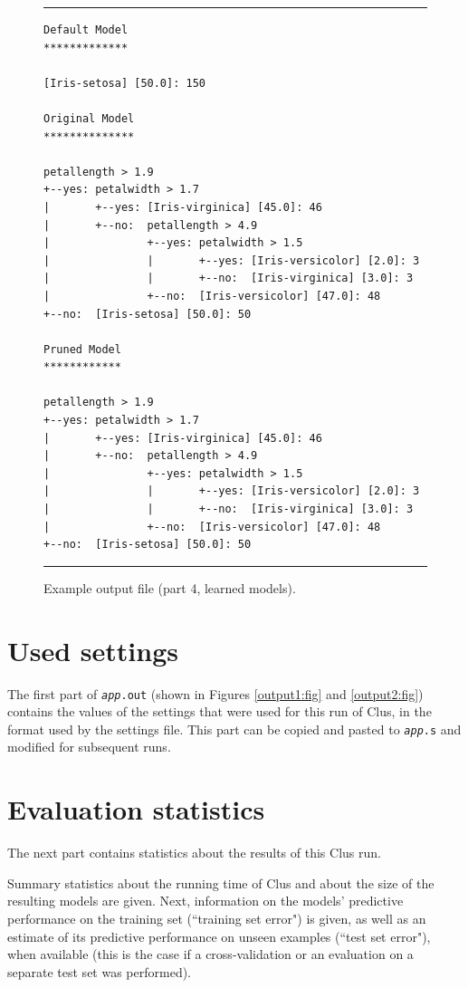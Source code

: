 \documentclass[a4paper]{report}
\begin{document}
\begin{figure}
\hrule
\begin{verbatim}
Default Model
*************

[Iris-setosa] [50.0]: 150

Original Model
**************

petallength > 1.9
+--yes: petalwidth > 1.7
|       +--yes: [Iris-virginica] [45.0]: 46
|       +--no:  petallength > 4.9
|               +--yes: petalwidth > 1.5
|               |       +--yes: [Iris-versicolor] [2.0]: 3
|               |       +--no:  [Iris-virginica] [3.0]: 3
|               +--no:  [Iris-versicolor] [47.0]: 48
+--no:  [Iris-setosa] [50.0]: 50

Pruned Model
************

petallength > 1.9
+--yes: petalwidth > 1.7
|       +--yes: [Iris-virginica] [45.0]: 46
|       +--no:  petallength > 4.9
|               +--yes: petalwidth > 1.5
|               |       +--yes: [Iris-versicolor] [2.0]: 3
|               |       +--no:  [Iris-virginica] [3.0]: 3
|               +--no:  [Iris-versicolor] [47.0]: 48
+--no:  [Iris-setosa] [50.0]: 50
\end{verbatim}
\hrule
\caption{Example output file (part 4, learned models).}
\label{output4:fig}
\end{figure}

\section{Used settings}

The first part of {\tt {\em app}.out} (shown in Figures \ref{output1:fig} and \ref{output2:fig}) contains the values of the settings that were used for this run of Clus, in the format used by the settings file.  This part can be copied and pasted to {\tt {\em app}.s} and modified for subsequent runs.

\section{Evaluation statistics}

The next part contains statistics about the results of this Clus run.

Summary statistics about the running time of Clus and about the size of the resulting models are given.  Next, information on the models' predictive performance on the training set (``training set error") is given, as well as an estimate of its predictive performance on unseen examples (``test set error"), when available (this is the case if a cross-validation or an evaluation on a separate test set was performed).  
\end{document}

